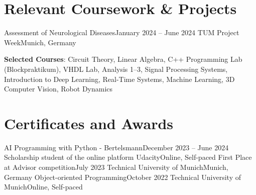 \documentclass[a4paper,11pt]{article}
\begin{document}
\section{Relevant Coursework \& Projects}
\resumeSubHeadingListStart
\resumeSubheading
        {Assessment of Neurological Diseases}{January 2024 -- June 2024}
        {TUM Project Week}{Munich, Germany}
        \resumeItemListStart
        \small{}
        \resumeItemListEnd
        \vspace{0.05cm}
\item \small\textbf{Selected Courses}: Circuit Theory, Linear Algebra, C++ Programming Lab (Blockpraktikum), VHDL Lab, Analysis 1--3, Signal Processing Systems, Introduction to Deep Learning, Real-Time Systems, Machine Learning, 3D Computer Vision, Robot Dynamics
\resumeSubHeadingListEnd


\section{Certificates and Awards}
\resumeSubHeadingListStart
\resumeSubheading
        {AI Programming with Python - Bertelsmann}{December 2023 -- June 2024}
        {Scholarship student of the online platform Udacity}{Online, Self-paced}\break
        \resumeItemListStart
         \small{}
        \resumeItemListEnd
        \vspace{0.1cm}
\resumeSubheading   
        {First Place at Advisor competition}{July 2023}
        {Technical University of Munich}{Munich, Germany}\break
      \vspace{0.1cm}
\resumeSubheading
        {Object-oriented Programming}{October 2022}
        {Technical University of Munich}{Online, Self-paced}
      \resumeItemListStart
        \small{}
    \resumeItemListEnd


\resumeSubHeadingListEnd
\end{document}
